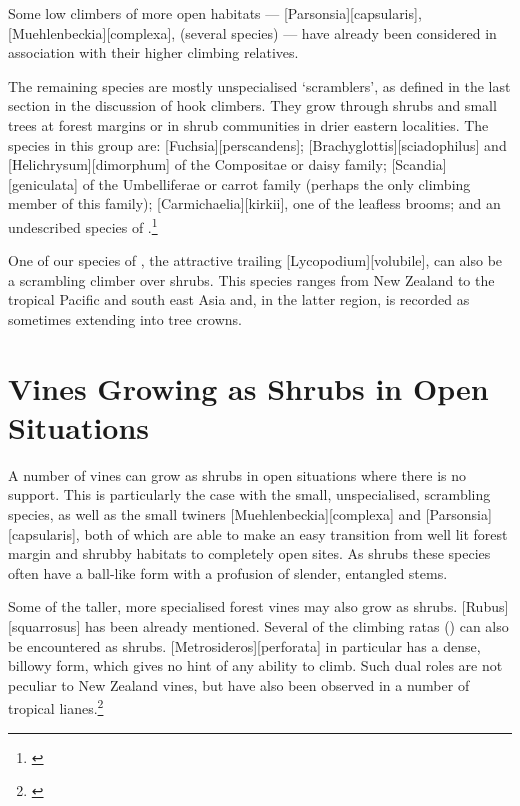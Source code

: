 Some low climbers of more open habitats --- [Parsonsia][capsularis], [Muehlenbeckia][complexa],  (several species) --- have already been considered in association with their higher climbing relatives.

The remaining species are mostly unspecialised `scramblers', as defined in the last section in the discussion of hook climbers.
They grow through shrubs and small trees at forest margins or in shrub communities in drier eastern localities.
The species in this group are: [Fuchsia][perscandens]; [Brachyglottis][sciadophilus] and [Helichrysum][dimorphum] of the Compositae or daisy family; [Scandia][geniculata] of the Umbelliferae or carrot family (perhaps the only climbing member of this family); [Carmichaelia][kirkii], one of the leafless brooms; and an undescribed species of .\footnote{\cite{eagle1982trees}}

One of our species of , the attractive trailing [Lycopodium][volubile], can also be a scrambling climber over shrubs.
This species ranges from New Zealand to the tropical Pacific and south east Asia and, in the latter region, is recorded as sometimes extending into tree crowns.

\section{Vines Growing as Shrubs in Open Situations}

A number of vines can grow as shrubs in open situations where there is no support.
This is particularly the case with the small, unspecialised, scrambling species, as well as the small twiners [Muehlenbeckia][complexa] and [Parsonsia][capsularis], both of which are able to make an easy transition from well lit forest margin and shrubby habitats to completely open sites.
As shrubs these species often have a ball-like form with a profusion of slender, entangled stems.

Some of the taller, more specialised forest vines may also grow as shrubs. [Rubus][squarrosus] has been already mentioned.
Several of the climbing ratas () can also be encountered as shrubs. [Metrosideros][perforata] in particular has a dense, billowy form, which gives no hint of any ability to climb.
Such dual roles are not peculiar to New Zealand vines, but have also been observed in a number of tropical lianes.\footnote{\cite{richards1952tropical}}

